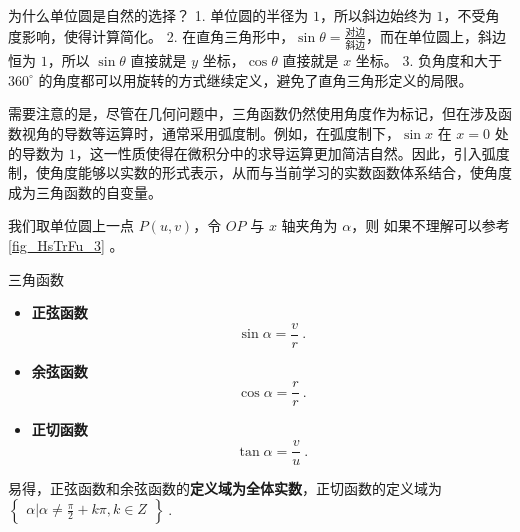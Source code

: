 为什么单位圆是自然的选择？
	1.	单位圆的半径为 $1$，所以斜边始终为 $1$，不受角度影响，使得计算简化。
	2.	在直角三角形中，$\sin\theta = \frac{\text{对边}}{\text{斜边}}$，而在单位圆上，斜边恒为 $1$，所以 $\sin\theta$ 直接就是 $y$ 坐标，$\cos\theta$ 直接就是 $x$ 坐标。
	3.	负角度和大于 $360^\circ$ 的角度都可以用旋转的方式继续定义，避免了直角三角形定义的局限。


需要注意的是，尽管在几何问题中，三角函数仍然使用角度作为标记，但在涉及函数视角的导数等运算时，通常采用弧度制。例如，在弧度制下，$\sin x$ 在 $x=0$ 处的导数为 $1$，这一性质使得在微积分中的求导运算更加简洁自然。因此，引入弧度制，使角度能够以实数的形式表示，从而与当前学习的实数函数体系结合，使角度成为三角函数的自变量。



我们取单位圆上一点 $P(u,v)$，令 $OP$ 与 $x$ 轴夹角为 $\alpha$，则
如果不理解可以参考\autoref{fig_HsTrFu_3} 。
\begin{definition}{三角函数}
\begin{itemize}
\item \textbf{正弦函数}
\begin{equation}
\displaystyle\sin \alpha = \frac{v}{r}~.
\end{equation}
\item \textbf{余弦函数}
\begin{equation}
\displaystyle\cos \alpha = \frac{r}{r}~.
\end{equation}
\item \textbf{正切函数}
\begin{equation}
\displaystyle\tan \alpha = \frac{v}{u}~.
\end{equation}
\end{itemize}
\end{definition}

易得，正弦函数和余弦函数的\textbf{定义域为全体实数}，正切函数的定义域为 $\begin{Bmatrix}\alpha|\alpha \neq \frac{\pi}{2}+k\pi,k\in Z\end{Bmatrix}~.$


